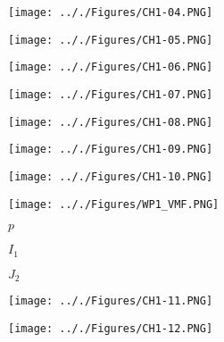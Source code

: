 \documentclass[onecolumn,11pt]{report}
\def\lthtmlcheckvsize{\ifdim\ht\sizebox<\vsize 
  \ifdim\wd\sizebox<\hsize\expandafter\hfill\fi \expandafter\vfill
  \else\expandafter\vss\fi}%
\begin{document}
{\newpage\clearpage
{}%
\texttt{[image: .././Figures/CH1-04.PNG]}%
\lthtmlpictureZ
\lthtmlcheckvsize\clearpage}

{\newpage\clearpage
{}%
\texttt{[image: .././Figures/CH1-05.PNG]}%
\lthtmlpictureZ
\lthtmlcheckvsize\clearpage}

{\newpage\clearpage
{}%
\texttt{[image: .././Figures/CH1-06.PNG]}%
\lthtmlpictureZ
\lthtmlcheckvsize\clearpage}

{\newpage\clearpage
{}%
\texttt{[image: .././Figures/CH1-07.PNG]}%
\lthtmlpictureZ
\lthtmlcheckvsize\clearpage}

{\newpage\clearpage
{}%
\texttt{[image: .././Figures/CH1-08.PNG]}%
\lthtmlpictureZ
\lthtmlcheckvsize\clearpage}

{\newpage\clearpage
{}%
\texttt{[image: .././Figures/CH1-09.PNG]}%
\lthtmlpictureZ
\lthtmlcheckvsize\clearpage}

{\newpage\clearpage
{}%
\texttt{[image: .././Figures/CH1-10.PNG]}%
\lthtmlpictureZ
\lthtmlcheckvsize\clearpage}

{\newpage\clearpage
{}%
\texttt{[image: .././Figures/WP1\_VMF.PNG]}%
\lthtmlpictureZ
\lthtmlcheckvsize\clearpage}

{\newpage\clearpage
{}%
$ p$%
\lthtmlindisplaymathZ
\lthtmlcheckvsize\clearpage}

{\newpage\clearpage
{}%
$ I_1$%
\lthtmlindisplaymathZ
\lthtmlcheckvsize\clearpage}

{\newpage\clearpage
{}%
$ J_2$%
\lthtmlindisplaymathZ
\lthtmlcheckvsize\clearpage}

{\newpage\clearpage
{}%
\texttt{[image: .././Figures/CH1-11.PNG]}%
\lthtmlpictureZ
\lthtmlcheckvsize\clearpage}

{\newpage\clearpage
{}%
\texttt{[image: .././Figures/CH1-12.PNG]}%
\lthtmlpictureZ
\lthtmlcheckvsize\clearpage}
\end{document}
